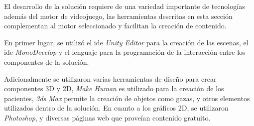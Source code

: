 El desarrollo de la solución requiere de una variedad importante de tecnologías
además del motor de videojuego, las herramientas descritas en esta sección complementan al
motor seleccionado y facilitan la creación de contenido.

En primer lugar, se utilizó el \Gls{ide} \textit{Unity Editor} para la creación de las escenas,
el \Gls{ide} \textit{MonoDevelop} y el lenguaje \cs{} para la programación de la
interacción entre los componentes de la solución.

Adicionalmente se utilizaron varias herramientas de diseño para crear
componentes 3D y 2D, \textit{Make Human} es utilizado para la creación de los
pacientes, \textit{3ds Max} permite la creación de objetos como gazas, y otros
elementos utilizados dentro de la solución. En cuanto a los gráficos 2D, se
utilizaron \textit{Photoshop}, y diversas páginas web que proveían contenido
gratuito.

